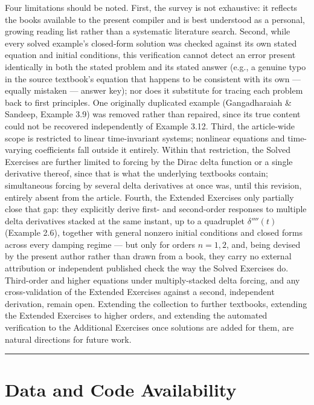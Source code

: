 \documentclass[
  11pt,
]{article}
\begin{document}
Four limitations should be noted. First, the survey is not exhaustive:
it reflects the books available to the present compiler and is best
understood as a personal, growing reading list rather than a systematic
literature search. Second, while every solved example's closed-form
solution was checked against its own stated equation and initial
conditions, this verification cannot detect an error present identically
in both the stated problem and its stated answer (e.g., a genuine typo
in the source textbook's equation that happens to be consistent with its
own --- equally mistaken --- answer key); nor does it substitute for
tracing each problem back to first principles. One originally duplicated
example (Gangadharaiah \& Sandeep, Example 3.9) was removed rather than
repaired, since its true content could not be recovered independently of
Example 3.12. Third, the article-wide scope is restricted to linear
time-invariant systems; nonlinear equations and time-varying
coefficients fall outside it entirely. Within that restriction, the
Solved Exercises are further limited to forcing by the Dirac delta
function or a single derivative thereof, since that is what the
underlying textbooks contain; simultaneous forcing by several delta
derivatives at once was, until this revision, entirely absent from the
article. Fourth, the Extended Exercises only partially close that gap:
they explicitly derive first- and second-order responses to multiple
delta derivatives stacked at the same instant, up to a quadruplet
\(\delta''''(t)\) (Example 2.6), together with general nonzero initial
conditions and closed forms across every damping regime --- but only for
orders \(n=1,2\), and, being devised by the present author rather than
drawn from a book, they carry no external attribution or independent
published check the way the Solved Exercises do. Third-order and higher
equations under multiply-stacked delta forcing, and any cross-validation
of the Extended Exercises against a second, independent derivation,
remain open. Extending the collection to further textbooks, extending
the Extended Exercises to higher orders, and extending the automated
verification to the Additional Exercises once solutions are added for
them, are natural directions for future work.

\begin{center}\rule{0.5\linewidth}{0.5pt}\end{center}

\hypertarget{data-and-code-availability}{%
\section{Data and Code Availability}\label{data-and-code-availability}}
\end{document}
